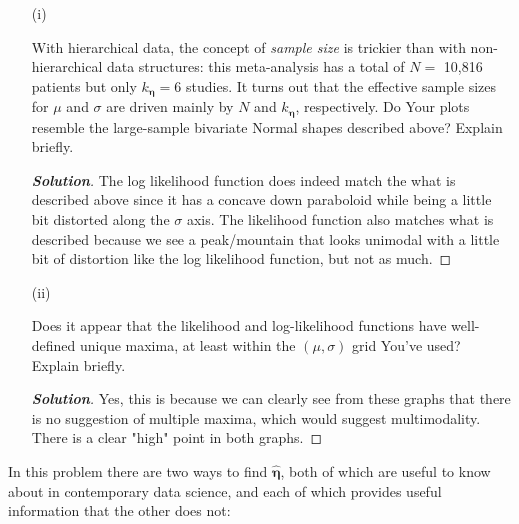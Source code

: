 \documentclass[12pt]{article}
\newenvironment{solution}{\begin{tcolorbox}[breakable]\begin{proof}[\textbf{\textit{Solution}}] }{\end{proof}\end{tcolorbox}}
\begin{document}
\begin{itemize}
\begin{itemize}
\item[(i)]

With hierarchical data, the concept of \textit{sample size} is trickier than with non-hierarchical data structures: this meta-analysis has a total of $N =$ 10,816 patients but only $k_{ \bm{ \eta } } = 6$ studies. It turns out that the effective sample sizes for $\mu$ and $\sigma$ are driven mainly by $N$ and $k_{ \bm{ \eta } }$, respectively. Do Your plots resemble the large-sample bivariate Normal shapes described above? Explain briefly. \textit{\fbox{\textbf{[5 points]}}}

\begin{solution}
    The log likelihood function does indeed match the what is described above since it has a concave down paraboloid while being a little bit distorted along the $\sigma$ axis. The likelihood function also matches what is described because we see a peak/mountain that looks unimodal with a little bit of distortion like the log likelihood function, but not as much.  
\end{solution}

\item[(ii)]

Does it appear that the likelihood and log-likelihood functions have well-defined unique maxima, at least within the $( \mu, \sigma )$ grid You've used?  Explain briefly. \textit{\fbox{\textbf{[5 points]}}}

\begin{solution}
    Yes, this is because we can clearly see from these graphs that there is no suggestion of multiple maxima, which would suggest multimodality. There is a clear "high" point in both graphs. 
\end{solution}

\end{itemize}

\end{itemize}

In this problem there are two ways to find $\hat{ \bm{ \eta } }$, both of which are useful to know about in contemporary data science, and each of which provides useful information that the other does not:
\end{document}

